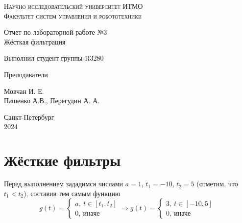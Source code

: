 \documentclass[a4paper,hidelinks,14pt]{extarticle}
\begin{document}
	\begin{titlepage}
		\setlength{\parindent}{0ex}
		
		\begin{center}
			\textsc{
				\vspace{1ex}
				Научно исследовательский университет ИТМО \\
				\vspace{0.5ex}
				Факультет систем управления и робототехники \\
				\vspace{0.5ex}
			}
		\end{center}
		
		\vspace{50mm}
		
		\begin{center}
			Отчет по лабораторной работе №3 \\
			Жёсткая фильтрация
		\end{center}
		
		\vspace{50mm}
		
		\begin{minipage}{.55\linewidth}
			Выполнил студент группы R3280
			
			Преподаватели
		\end{minipage}
		\hfill
		\begin{minipage}{.5\linewidth}
			\begin{flushright}
				Мовчан И. Е.
				\\
				Пашенко А.В., Перегудин А. А.
			\end{flushright}
		\end{minipage}
		
		\vfill
		\begin{center}
			Санкт-Петербург
			\\
			2024
		\end{center}
		
	\end{titlepage}
	
	\section{Жёсткие фильтры}
	
	Перед выполнением зададимся числами $a = 1$, $t_1=-10$, $t_2=5$ (отметим, что $t_1 < t_2$), составив тем самым функцию $$g(t) = \left\{ 
	\begin{array}{l}
		a,\ t \in [t_1, t_2] \\
		0,\ \text{иначе}
	\end{array} 
	\right.
	\Rightarrow
	g(t) = 
	\left\{ 
	\begin{array}{l}
		3,\ t \in [-10, 5] \\
		0,\ \text{иначе}
	\end{array} 
	\right.$$
	
\end{document}
